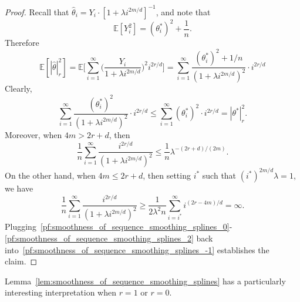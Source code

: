 \documentclass{article}
\newcommand{\1}{\mathbf{1}}
\newcommand{\Ebb}{\mathbb{E}}
\newcommand{\wh}[1]{\widehat{#1}}
\theoremstyle{alden}
\theoremstyle{aldenthm}
\theoremstyle{definition}
\theoremstyle{remark}
\begin{document}
\begin{proof}
	Recall that $\wh{\theta}_i = Y_i \cdot [1 + \lambda i^{2m/d}]^{-1}$, and note that
	\begin{equation*}
	\Ebb[Y_i^2] = (\theta_i^{\ast})^2 + \frac{1}{n}.
	\end{equation*} 
	Therefore
	\begin{equation}
	\label{pf:smoothness_of_sequence_smoothing_splines_-1}
	\Ebb[|\wh{\theta}|_{r}^2] = \Ebb\biggl[\sum_{i = 1}^{\infty} \biggl(\frac{Y_i}{1 + \lambda i^{2m/d}}\biggr)^2 i^{2r/d}\biggr] = \sum_{i = 1}^{\infty} \frac{(\theta_i^{\ast})^2 + 1/n}{(1 + \lambda i^{2m/d})^2} \cdot i^{2r/d}
	\end{equation}
	Clearly,
	\begin{equation}
	\label{pf:smoothness_of_sequence_smoothing_splines_0}
	\sum_{i = 1}^{\infty} \frac{(\theta_i^{\ast})^2}{(1 + \lambda i^{2m/d})^2}  \cdot i^{2r/d} \leq \sum_{i = 1}^{\infty} (\theta_i^{\ast})^2 \cdot i^{2r/d} = |\theta^{\ast}|_{r}^2.
	\end{equation}
	Moreover, when $4m > 2r + d$, then
	\begin{equation}
	\label{pf:smoothness_of_sequence_smoothing_splines_1}
	\frac{1}{n}\sum_{i = 1}^{\infty} \frac{i^{2r/d}}{(1 + \lambda i^{2m/d})^2} \leq \frac{1}{n} \lambda^{-(2r + d)/(2m)}.
	\end{equation}
	On the other hand, when $4m \leq 2r + d$, then setting $i^{\ast}$ such that $(i^{\ast})^{2m/d}\lambda = 1$, we have
	\begin{equation}
	\label{pf:smoothness_of_sequence_smoothing_splines_2}
	\frac{1}{n}\sum_{i = 1}^{\infty} \frac{i^{2r/d}}{(1 + \lambda i^{2m/d})^2} \geq 	\frac{1}{2\lambda^2n}\sum_{i = i^{\ast}}^{\infty} i^{(2r - 4m)/d} = \infty.
	\end{equation}
	Plugging~\eqref{pf:smoothness_of_sequence_smoothing_splines_0}-\eqref{pf:smoothness_of_sequence_smoothing_splines_2} back into~\eqref{pf:smoothness_of_sequence_smoothing_splines_-1} establishes the claim.
\end{proof}
Lemma~\ref{lem:smoothness_of_sequence_smoothing_splines} has a particularly interesting interpretation when $r = 1$ or $r = 0$. 
\end{document}
